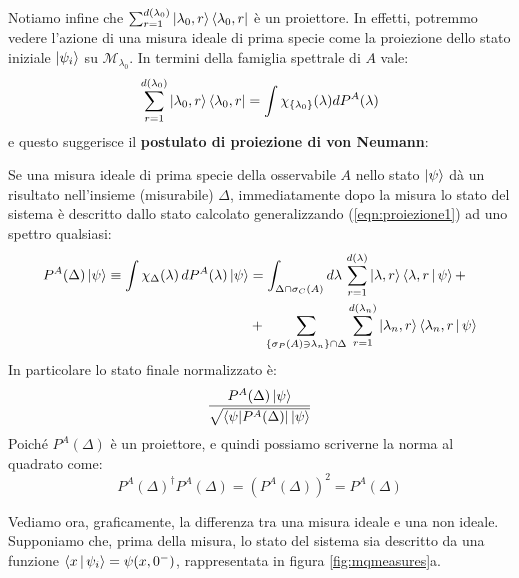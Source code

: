 \documentclass[../../FisicaTeorica.tex]{subfiles}
\begin{document}
Notiamo infine che $\sum_{r=1}^{d(\lambda_0)}\Ket{\lambda_0,r}\Bra{\lambda_0,r}$ è un proiettore. In effetti, potremmo vedere l'azione di una misura ideale di prima specie come la proiezione dello stato iniziale $\Ket{\psi_i}$ su $\mathcal{M}_{\lambda_0}$. In termini della famiglia spettrale di $A$ vale:
\begin{equation}
\sum_{r=1}^{d(\lambda_0)} \Ket{\lambda_0,r}\Bra{\lambda_0,r} = \int \chi_{\{\lambda_0\}}(\lambda) dP^A(\lambda)
\label{eqn:proiezione1}
\end{equation}
e questo suggerisce il \textbf{postulato di proiezione di von Neumann}:\\
\begin{axi}
Se una misura ideale di prima specie della osservabile $A$ nello stato $\Ket{\psi}$ dà un risultato nell'insieme (misurabile) $\Delta$, immediatamente dopo la misura lo stato del sistema è descritto dallo stato calcolato generalizzando (\ref{eqn:proiezione1}) ad uno spettro qualsiasi:
\begin{align*}
P^A(\Delta)\Ket{\psi} \equiv \int \chi_\Delta(\lambda)\,dP^A(\lambda)\Ket{\psi}&=\int_{\Delta \cap \sigma_C(A)} d\lambda\, \sum_{r=1}^{d(\lambda)}\Ket{\lambda,r}\Braket{\lambda,r|\psi}+\\
&+ \sum_{\{\sigma_P(A)\ni \lambda_n\} \cap \Delta} \sum_{r=1}^{d(\lambda_n)} \Ket{\lambda_n,r}\Braket{\lambda_n,r|\psi}
\end{align*}
In particolare lo stato finale normalizzato è:
\[
\frac{P^A(\Delta)\Ket{\psi}}{\sqrt{\Bra{\psi|P^A(\Delta)}\Ket{\psi}}}
\]
Poiché $P^A(\Delta)$ è un proiettore, e quindi possiamo scriverne la norma al quadrato come:
\[
P^A(\Delta)^\dag P^A(\Delta)=(P^A(\Delta))^2=P^A(\Delta)
\]
\end{axi}

Vediamo ora, graficamente, la differenza tra una misura ideale e una non ideale.\\
Supponiamo che, prima della misura, lo stato del sistema sia descritto da una funzione $\Braket{x|\psi_i} = \psi(x,0^-)$, rappresentata in figura \ref{fig:mqmeasures}a.
\end{document}
